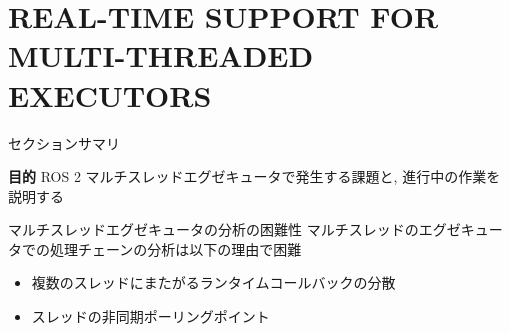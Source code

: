 
\section{REAL-TIME SUPPORT FOR MULTI-THREADED EXECUTORS}
\label{sec: real-time support for multi-threaded executors}

\begin{frame}{セクションサマリ}
    \begin{itembox}[l]{\textbf{目的}}
        ROS 2 マルチスレッドエグゼキュータで発生する課題と, 進行中の作業を説明する
    \end{itembox}
\end{frame}


\begin{frame}{マルチスレッドエグゼキュータの分析の困難性}
    マルチスレッドのエグゼキュータでの処理チェーンの分析は以下の理由で困難
    \begin{itemize}
        \item 複数のスレッドにまたがるランタイムコールバックの分散
        \item スレッドの非同期ポーリングポイント
    \end{itemize}
\end{frame}

